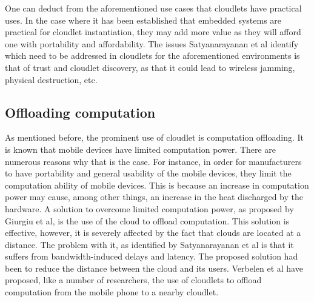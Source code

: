 \noindent One can deduct from the aforementioned use cases that cloudlets have practical uses. In the case where it has been established that embedded systems are practical for cloudlet instantiation, they may add more value as they will afford one with portability and affordability. The issues Satyanarayanan et al\cite{RefWorks:107} identify which need to be addressed in cloudlets for the aforementioned environments is that of trust and cloudlet discovery, as that it could lead to wireless jamming, physical destruction, etc.

\subsection{Offloading computation}

As mentioned before, the prominent use of cloudlet is computation offloading. It is known that mobile devices have limited computation power. There are numerous reasons why that is the case.
For instance, in order for manufacturers to have portability and general usability of the mobile devices, they limit the computation ability of mobile devices. This is because an increase in
computation power may cause, among other things, an increase in the heat discharged by the hardware. A solution to overcome limited computation power, as proposed by Giurgiu et al\cite{giurgiu2009calling},
is the use of the cloud to offload computation. This solution is effective, however, it is severely affected by the fact that clouds are located at a distance. The problem with it, as
identified by Satyanarayanan et al\cite{satyanarayanan2009case} is that it suffers from bandwidth-induced delays and latency. The proposed solution had been to reduce the distance between the cloud and its users. Verbelen et al\cite{RefWorks:93} have proposed, like a number of
researchers, the use of cloudlets to offload computation from the mobile phone to a nearby cloudlet.\newline

